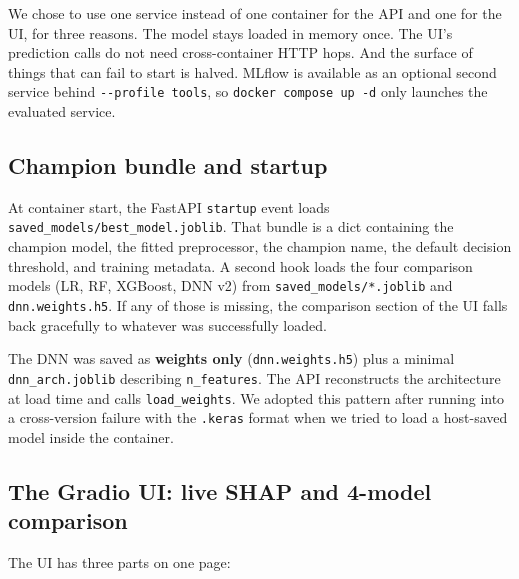 We chose to use one service instead of one container for the API and one
for the UI, for three reasons. The model stays loaded in memory once.
The UI's prediction calls do not need cross-container HTTP hops. And the
surface of things that can fail to start is halved. MLflow is available
as an optional second service behind \texttt{-\/-profile\ tools}, so
\texttt{docker\ compose\ up\ -d} only launches the evaluated service.

\subsection{Champion bundle and
startup}\label{champion-bundle-and-startup}

At container start, the FastAPI \texttt{startup} event loads
\texttt{saved\_models/best\_model.joblib}. That bundle is a dict
containing the champion model, the fitted preprocessor, the champion
name, the default decision threshold, and training metadata. A second
hook loads the four comparison models (LR, RF, XGBoost, DNN v2) from
\texttt{saved\_models/*.joblib} and \texttt{dnn.weights.h5}. If any of
those is missing, the comparison section of the UI falls back gracefully
to whatever was successfully loaded.

The DNN was saved as \textbf{weights only} (\texttt{dnn.weights.h5})
plus a minimal \texttt{dnn\_arch.joblib} describing
\texttt{n\_features}. The API reconstructs the architecture at load time
and calls \texttt{load\_weights}. We adopted this pattern after running
into a cross-version failure with the \texttt{.keras} format when we
tried to load a host-saved model inside the container.

\subsection{The Gradio UI: live SHAP and 4-model
comparison}\label{the-gradio-ui-live-shap-and-4-model-comparison}

The UI has three parts on one page:

